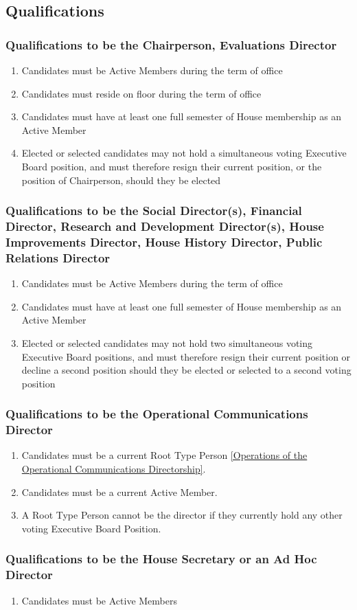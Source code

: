 \documentclass{article}
\newcommand{\asection}[1]{\subsection{#1} \label{#1}}
\newcommand{\asubsection}[1]{\subsubsection{#1} \label{#1}}
\begin{document}
\asection{Qualifications}
\asubsection{Qualifications to be the Chairperson, Evaluations Director}
\begin{enumerate}
	\item Candidates must be Active Members during the term of office
	\item Candidates must reside on floor during the term of office
	\item Candidates must have at least one full semester of House membership as an Active Member
	\item Elected or selected candidates may not hold a simultaneous voting Executive Board position, and must therefore resign their current position, or the position of Chairperson, should they be elected
\end{enumerate}
\asubsection{Qualifications to be the Social Director(s), Financial Director, Research and Development Director(s), House Improvements Director, House History Director, Public Relations Director}
\begin{enumerate}
	\item Candidates must be Active Members during the term of office
	\item Candidates must have at least one full semester of House membership as an Active Member
	\item Elected or selected candidates may not hold two simultaneous voting Executive Board positions, and must therefore resign their current position or decline a second position should they be elected or selected to a second voting position
\end{enumerate}
\asubsection{Qualifications to be the Operational Communications Director}
\begin{enumerate}
	\item Candidates must be a current Root Type Person \ref{Operations of the Operational Communications Directorship}.
	\item Candidates must be a current Active Member.
	\item A Root Type Person cannot be the director if they currently hold any other voting Executive Board Position.
\end{enumerate}

\asubsection{Qualifications to be the House Secretary or an Ad Hoc Director}
\begin{enumerate}
\item Candidates must be Active Members
\end{enumerate}
\end{document}
